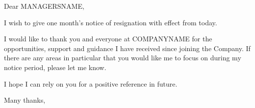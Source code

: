 \documentclass{letter}
\date{\displaydate{date}}
\begin{document}
\begin{letter}{}
\opening{Dear MANAGERSNAME,}

I wish to give one month's notice of resignation with effect from today.

I would like to thank you and everyone at COMPANYNAME for the opportunities,
support and guidance I have received since joining the Company. If there are
any areas in particular that you would like me to focus on during my notice
period, please let me know.

I hope I can rely on you for a positive reference in future.

\closing{Many thanks,}

\end{letter}
\end{document}
